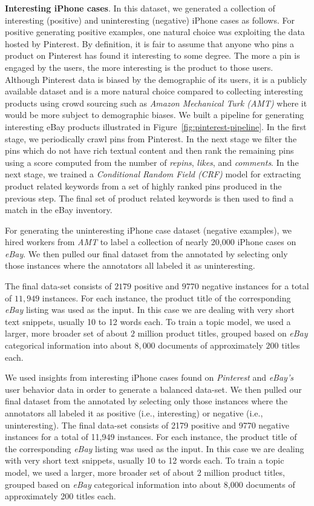 {\bf Interesting iPhone cases}.
In this dataset, we generated a collection of interesting (positive) and uninteresting (negative) iPhone cases as follows. For positive generating positive examples, one natural choice was exploiting the data hosted by Pinterest. By definition, it is fair to assume that anyone who pins a product on Pinterest has found it interesting to some degree. The more a pin is engaged by the users, the more interesting is the product to those users. Although Pinterest data is biased by the demographic of its users, it is a publicly available dataset and is a more natural choice compared to collecting interesting products using crowd sourcing such as  {\em Amazon Mechanical Turk (AMT)} where it would be more subject to demographic biases. We built a pipeline for generating interesting eBay products illustrated in Figure~\ref{fig:pinterest-pipeline}.  In the first stage, we periodically crawl pins from Pinterest. In the next stage we filter the pins which do not have rich textual content and then rank the remaining pins using a score computed from the number of {\em repins}, {\em likes}, and {\em comments}. In the next stage, we trained a {\em Conditional Random Field (CRF)} model for extracting product related keywords from a set of highly ranked pins produced in the previous step. The final set of product related keywords  is then used to find a match in the eBay inventory. 

For generating the uninteresting iPhone case dataset (negative examples), we
hired workers from {\em AMT} to label a collection
of nearly 20,000 iPhone cases on {\em eBay}.  We then pulled our final dataset from the annotated by selecting only those instances where the annotators all labeled it as uninteresting. 

The final data-set consists of $2179$ positive and $9770$ negative instances
for a total of $11,949$ instances. For each instance, the product title of
the corresponding {\em eBay} listing was used as the input. In this case we are
dealing with very short text snippets, usually 10 to 12 words each. To
train a topic model, we used a larger, more broader set of about
$2$ million product titles, grouped based on {\em eBay} categorical information into about $8,000$
documents of approximately $200$ titles each.


We used insights from 
interesting iPhone cases found on {\em Pinterest} and {\em eBay's}
user behavior data in order to generate a balanced data-set.  
We then pulled our final dataset from the annotated by selecting only
those instances where the annotators all labeled it as 
positive (i.e., interesting) or negative (i.e., uninteresting). The
final data-set consists of 2179 positive and 9770 negative instances
for a total of 11,949 instances. For each instance, the product title of
the corresponding {\em eBay} listing was used as the input. In this case we are
dealing with very short text snippets, usually 10 to 12 words each. To
train a topic model, we used a larger, more broader set of about
2 million product titles, grouped based on {\em eBay} categorical information into about 8,000
documents of approximately 200 titles each.

